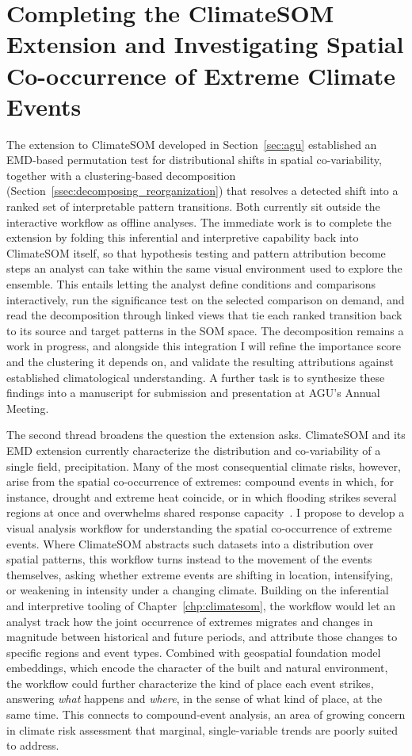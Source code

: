\section{Completing the ClimateSOM Extension and Investigating Spatial Co-occurrence of Extreme Climate Events}
The extension to ClimateSOM developed in Section~\ref{sec:agu} established an EMD-based permutation test for distributional shifts in spatial co-variability, together with a clustering-based decomposition (Section~\ref{ssec:decomposing_reorganization}) that resolves a detected shift into a ranked set of interpretable pattern transitions.
%
Both currently sit outside the interactive workflow as offline analyses.
%
The immediate work is to complete the extension by folding this inferential and interpretive capability back into ClimateSOM itself, so that hypothesis testing and pattern attribution become steps an analyst can take within the same visual environment used to explore the ensemble.
%
This entails letting the analyst define conditions and comparisons interactively, run the significance test on the selected comparison on demand, and read the decomposition through linked views that tie each ranked transition back to its source and target patterns in the SOM space.
%
The decomposition remains a work in progress, and alongside this integration I will refine the importance score and the clustering it depends on, and validate the resulting attributions against established climatological understanding.
%
A further task is to synthesize these findings into a manuscript for submission and presentation at AGU's Annual Meeting.

The second thread broadens the question the extension asks.
%
ClimateSOM and its EMD extension currently characterize the distribution and co-variability of a single field, precipitation.
%
Many of the most consequential climate risks, however, arise from the spatial co-occurrence of extremes: compound events in which, for instance, drought and extreme heat coincide, or in which flooding strikes several regions at once and overwhelms shared response capacity~\cite{seneviratne2021weather}.
%
I propose to develop a visual analysis workflow for understanding the spatial co-occurrence of extreme events.
%
Where ClimateSOM abstracts such datasets into a distribution over spatial patterns, this workflow turns instead to the movement of the events themselves, asking whether extreme events are shifting in location, intensifying, or weakening in intensity under a changing climate.
%
Building on the inferential and interpretive tooling of Chapter~\ref{chp:climatesom}, the workflow would let an analyst track how the joint occurrence of extremes migrates and changes in magnitude between historical and future periods, and attribute those changes to specific regions and event types.
%
Combined with geospatial foundation model embeddings, which encode the character of the built and natural environment, the workflow could further characterize the kind of place each event strikes, answering \emph{what} happens and \emph{where}, in the sense of what kind of place, at the same time.
%
This connects to compound-event analysis, an area of growing concern in climate risk assessment that marginal, single-variable trends are poorly suited to address.


